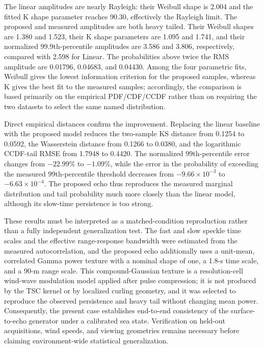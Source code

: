 The linear amplitudes are nearly Rayleigh: their Weibull shape is 2.004 and the fitted K shape parameter reaches 90.30, effectively the Rayleigh limit. The proposed and measured amplitudes are both heavy tailed. Their Weibull shapes are 1.380 and 1.523, their K shape parameters are 1.095 and 1.741, and their normalized 99.9th-percentile amplitudes are 3.586 and 3.806, respectively, compared with 2.598 for Linear. The probabilities above twice the RMS amplitude are 0.01796, 0.04683, and 0.04430. Among the four parametric fits, Weibull gives the lowest information criterion for the proposed samples, whereas K gives the best fit to the measured samples; accordingly, the comparison is based primarily on the empirical PDF/CDF/CCDF rather than on requiring the two datasets to select the same named distribution.

Direct empirical distances confirm the improvement. Replacing the linear baseline with the proposed model reduces the two-sample KS distance from 0.1254 to 0.0592, the Wasserstein distance from 0.1266 to 0.0380, and the logarithmic CCDF-tail RMSE from 1.7948 to 0.4420. The normalized 99th-percentile error changes from $-22.99\%$ to $-1.09\%$, while the error in the probability of exceeding the measured 99th-percentile threshold decreases from $-9.66\times10^{-3}$ to $-6.63\times10^{-4}$. The proposed echo thus reproduces the measured marginal distribution and tail probability much more closely than the linear model, although its slow-time persistence is too strong.

These results must be interpreted as a matched-condition reproduction rather than a fully independent generalization test. The fast and slow speckle time scales and the effective range-response bandwidth were estimated from the measured autocorrelation, and the proposed echo additionally uses a unit-mean, correlated Gamma power texture with a nominal shape of one, a 1.8-s time scale, and a 90-m range scale. This compound-Gaussian texture is a resolution-cell wind-wave modulation model applied after pulse compression; it is not produced by the TSC kernel or by localized curling geometry, and it was selected to reproduce the observed persistence and heavy tail without changing mean power. Consequently, the present case establishes end-to-end consistency of the surface-to-echo generator under a calibrated sea state. Verification on held-out acquisitions, wind speeds, and viewing geometries remains necessary before claiming environment-wide statistical generalization.











